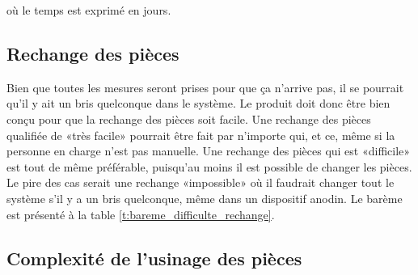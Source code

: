 où le temps est exprimé en jours.


\subsection{Rechange des pièces}

\begin{table}
   \caption{Évaluation du barème de la difficulté de la rechange des pièces}
   \label{t:bareme_difficulte_rechange}
\end{table}

Bien que toutes les mesures seront prises pour que ça n'arrive pas, il se pourrait qu'il y ait un bris quelconque dans le système. Le produit doit donc être bien conçu pour que la rechange des pièces soit facile. Une rechange des pièces qualifiée de «très facile» pourrait être fait par n'importe qui, et ce, même si la personne en charge n'est pas manuelle. Une rechange des pièces qui est «difficile» est tout de même préférable, puisqu'au moins il est possible de changer les pièces. Le pire des cas serait une rechange «impossible» où il faudrait changer tout le système s'il y a un bris quelconque, même dans un dispositif anodin. Le barème est présenté à la table \ref{t:bareme_difficulte_rechange}.

\subsection{Complexité de l'usinage des pièces}

